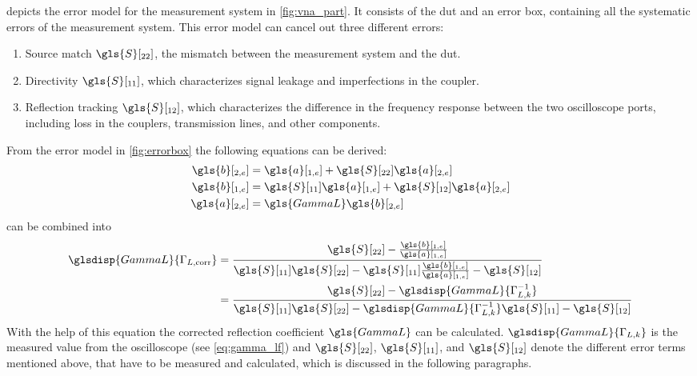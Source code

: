 \documentclass[12pt,a4paper,parskip=full,abstract=true,BCOR=12mm]{scrreprt}
\begin{document}
 depicts the error model for the measurement system in \cref{fig:vna_part}. It
consists of the \gls{dut} and an error box, containing all the systematic errors of the measurement
system. This error model can cancel out three different errors:
\begin{enumerate}
    \item Source match $\gls{S}[_{22}]$, the mismatch between the measurement system and the \gls{dut}.
    \item Directivity $\gls{S}[_{11}]$, which characterizes signal leakage and imperfections in the coupler.
    \item Reflection tracking $\gls{S}[_{12}]$, which characterizes the difference in the frequency response
        between the two oscilloscope ports, including loss in the couplers, transmission lines, and
        other components.
\end{enumerate}

From the error model in \cref{fig:errorbox} the following equations can be derived:
\begin{align}
    \label{eq:b2} \gls{b}[_{2,e}] & = \gls{a}[_{1,e}] + \gls{S}[_{22}] \gls{a}[_{2,e}]\\
    \label{eq:b1} \gls{b}[_{1,e}] & = \gls{S}[_{11}] \gls{a}[_{1,e}] + \gls{S}[_{12}] \gls{a}[_{2,e}] \\
    \label{eq:a2} \gls{a}[_{2,e}] & = \gls{GammaL} \gls{b}[_{2,e}]
\end{align}
 can be combined into
\begin{equation}\label{eq:gamma_err}
    \begin{split}
        \glsdisp{GammaL}{\Gamma_{L,\text{corr}}} & = \frac{\gls{S}[_{22}] - \frac{\gls{b}[_{1,e}]}{\gls{a}[_{1,e}]}}{\gls{S}[_{11}] \gls{S}[_{22}] - \gls{S}[_{11}]\frac{\gls{b}[_{1,e}]}{\gls{a}[_{1,e}]} - \gls{S}[_{12}]} \\
        & = \frac{\gls{S}[_{22}] - \glsdisp{GammaL}{\Gamma_{L,k}^{-1}}}{\gls{S}[_{11}] \gls{S}[_{22}] - \glsdisp{GammaL}{\Gamma_{L,k}^{-1}}\gls{S}[_{11}] - \gls{S}[_{12}]}
    \end{split}
\end{equation}
With the help of this equation the corrected reflection coefficient $\gls{GammaL}$ can be calculated.
$\glsdisp{GammaL}{\Gamma_{L,k}}$ is the measured value from the oscilloscope (see \cref{eq:gamma_lf}) and $\gls{S}[_{22}]$, $\gls{S}[_{11}]$, and $\gls{S}[_{12}]$ denote the different
error terms mentioned above, that have to be measured and calculated, which is discussed in the following paragraphs.
\end{document}
